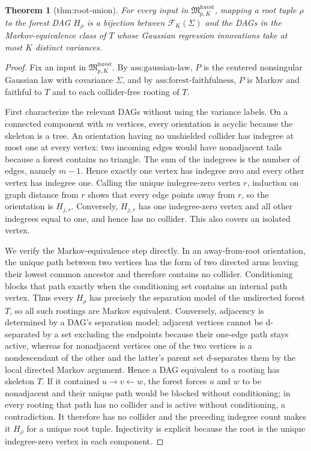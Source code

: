 \documentclass{article}
\newtheorem{theorem}{Theorem}
\begin{document}
\begin{theorem}[thm:root-union]\label{thm:root-union}
For every input in \(\mathfrak M_{p,K}^{\mathrm{forest}}\), mapping a root tuple \(\rho\) to the forest DAG \(H_\rho\) is a bijection between \(\mathcal F_K(\Sigma)\) and the DAGs in the Markov-equivalence class of \(T\) whose Gaussian regression innovations take at most \(K\) distinct variances.
\end{theorem}
\begin{proof}
Fix an input in \(\mathfrak M_{p,K}^{\mathrm{forest}}\).  By \(\text{ass:gaussian-law}\), \(P\) is the centered nonsingular Gaussian law with covariance \(\Sigma\), and by \(\text{ass:forest-faithfulness}\), \(P\) is Markov and faithful to \(T\) and to each collider-free rooting of \(T\).

First characterize the relevant DAGs without using the variance labels.  On a connected component with \(m\) vertices, every orientation is acyclic because the skeleton is a tree.  An orientation having no unshielded collider has indegree at most one at every vertex: two incoming edges would have nonadjacent tails because a forest contains no triangle.  The sum of the indegrees is the number of edges, namely \(m-1\).  Hence exactly one vertex has indegree zero and every other vertex has indegree one.  Calling the unique indegree-zero vertex \(r\), induction on graph distance from \(r\) shows that every edge points away from \(r\), so the orientation is \(H_{j,r}\).  Conversely, \(H_{j,r}\) has one indegree-zero vertex and all other indegrees equal to one, and hence has no collider.  This also covers an isolated vertex.

We verify the Markov-equivalence step directly.  In an away-from-root orientation, the unique path between two vertices has the form of two directed arms leaving their lowest common ancestor and therefore contains no collider.  Conditioning blocks that path exactly when the conditioning set contains an internal path vertex.  Thus every \(H_\rho\) has precisely the separation model of the undirected forest \(T\), so all such rootings are Markov equivalent.  Conversely, adjacency is determined by a DAG's separation model: adjacent vertices cannot be d-separated by a set excluding the endpoints because their one-edge path stays active, whereas for nonadjacent vertices one of the two vertices is a nondescendant of the other and the latter's parent set d-separates them by the local directed Markov argument.  Hence a DAG equivalent to a rooting has skeleton \(T\).  If it contained \(u\to v\leftarrow w\), the forest forces \(u\) and \(w\) to be nonadjacent and their unique path would be blocked without conditioning; in every rooting that path has no collider and is active without conditioning, a contradiction.  It therefore has no collider and the preceding indegree count makes it \(H_\rho\) for a unique root tuple.  Injectivity is explicit because the root is the unique indegree-zero vertex in each component.


\end{proof}
\end{document}
